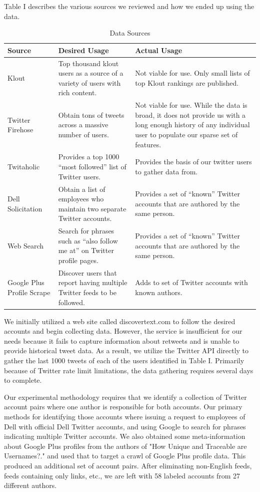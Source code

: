 \documentclass[10pt, conference, compsocconf]{IEEEtran}
\begin{document}
Table I describes the various sources we reviewed and how we ended up using the data.
\begin{table}[!h]
  \centering
  \begin{tabularx}{\linewidth}{X X X}
    \toprule
    \bf{Source} & \bf{Desired Usage} & \bf{Actual Usage} \\ \midrule
    Klout & Top thousand klout users as a source of a variety of users with rich content. & Not viable for use. Only small lists of top Klout rankings are published. \\ \midrule
    Twitter Firehose & Obtain tons of tweets across a massive number of users. & Not viable for use. While the data is broad, it does not provide us with a long enough history of any individual user to populate our sparse set of features. \\ \midrule
    Twitaholic & Provides a top 1000 “most followed” list of Twitter users. & Provides the basis of our twitter users to gather data from. \\ \midrule
    Dell Solicitation & Obtain a list of employees who maintain two separate Twitter accounts. & Provides a set of “known” Twitter accounts that are authored by the same person. \\ \midrule
    Web Search & Search for phrases such as “also follow me at” on Twitter profile pages. & Provides a set of “known” Twitter accounts that are authored by the same person. \\ \midrule
    Google Plus Profile Scrape & Discover users that report having multiple Twitter feeds to be followed. & Adds to set of Twitter accounts with known authors. \\
    \bottomrule
  \end{tabularx}
  \caption{Data Sources}
\end{table}
We initially utilized a web site called discovertext.com to follow the
desired accounts and begin collecting data. However, the service is
insufficient for our needs because it fails to capture information
about retweets and is unable to provide historical tweet data. As a
result, we utilize the Twitter API directly to gather the last 1000
tweets of each of the users identified in Table I. Primarily because
of Twitter rate limit limitations, the data gathering requires several
days to complete.

Our experimental methodology requires that we identify a collection of
Twitter account pairs where one author is responsible for both
accounts. Our primary methods for identifying those accounts where
issuing a request to employees of Dell with official Dell Twitter
accounts, and using Google to search for phrases indicating multiple
Twitter accounts. We also obtained some meta-information about Google
Plus profiles from the authors of "How Unique and Traceable are
Usernames?." \cite{Perito} and used that to target a crawl of Google
Plus profile data. This produced an additional set of account
pairs. After eliminating non-English feeds, feeds containing only
links, etc., we are left with 58 labeled accounts from 27 different
authors.
\end{document}
